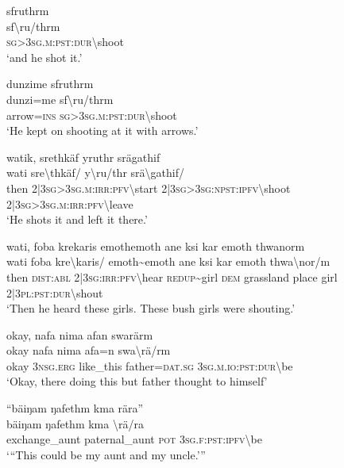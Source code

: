\ea\label{ex:12:a747}
sfruthrm\\
\gll sf{\textbackslash}ru/thrm\\
     \textsc{sg}>3\textsc{sg}.\textsc{m}:\textsc{pst}:\textsc{dur}{\textbackslash}shoot\\
\glt `and he shot it.'
\z

\ea\label{ex:12:a748}
dunzime sfruthrm\\
\gll dunzi=me	sf{\textbackslash}ru/thrm\\
     arrow=\textsc{ins}	\textsc{sg}>3\textsc{sg}.\textsc{m}:\textsc{pst}:\textsc{dur}{\textbackslash}shoot\\
\glt `He kept on shooting at it with arrows.'
\z

\ea\label{ex:12:a749}
watik, srethkäf yruthr srägathif\\
\gll wati	sre{\textbackslash}thkäf/	y{\textbackslash}ru/thr	srä{\textbackslash}gathif/\\
     then	2|3\textsc{sg}>3\textsc{sg}.\textsc{m}:\textsc{irr}:\textsc{pfv}{\textbackslash}start	2|3\textsc{sg}>3\textsc{sg}:\textsc{npst}:\textsc{ipfv}{\textbackslash}shoot	2|3\textsc{sg}>3\textsc{sg}.\textsc{m}:\textsc{irr}:\textsc{pfv}{\textbackslash}leave\\
\glt `He shots it and left it there.'
\z

\ea\label{ex:12:a752}
wati, foba krekaris emothemoth ane ksi kar emoth thwanorm\\
\gll wati	foba	kre{\textbackslash}karis/	emoth{\textasciitilde}emoth	ane	ksi	kar	emoth	thwa{\textbackslash}nor/m\\
     then	\textsc{dist}:\textsc{abl}	2|3\textsc{sg}:\textsc{irr}:\textsc{pfv}{\textbackslash}hear	\textsc{redup}{\textasciitilde}girl	\textsc{dem}	grassland	place	girl	2|3\textsc{pl}:\textsc{pst}:\textsc{dur}{\textbackslash}shout\\
\glt `Then he heard these girls. These bush girls were shouting.'
\z

\ea\label{ex:12:a753}
okay, nafa nima afan swarärm\\
\gll okay	nafa	nima	afa=n	swa{\textbackslash}rä/rm\\
     okay	3\textsc{nsg}.\textsc{erg}	like\_this	father=\textsc{dat}.\textsc{sg}	3\textsc{sg}.\textsc{m}.\textsc{io}:\textsc{pst}:\textsc{dur}{\textbackslash}be\\
\glt `Okay, there doing this but father thought to himself'
\z

\ea\label{ex:12:a755}
``bäiŋam ŋafethm kma rära''\\
\gll bäiŋam	ŋafethm	kma	{\textbackslash}rä/ra\\
     exchange\_aunt	paternal\_aunt	\textsc{pot}	3\textsc{sg}.\textsc{f}:\textsc{pst}:\textsc{ipfv}{\textbackslash}be\\
\glt `{``}This could be my aunt and my uncle.'''
\z

